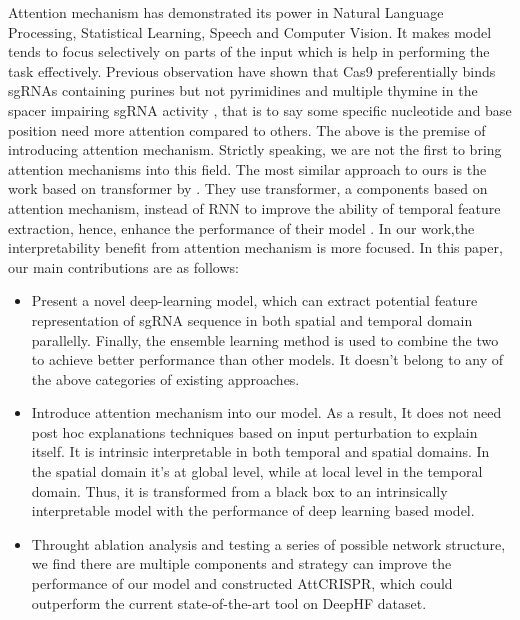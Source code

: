 \documentclass{bioinfo}
\begin{document}
Attention mechanism has demonstrated its power in Natural Language Processing, Statistical Learning, Speech and Computer Vision. 
 It makes model tends to focus selectively on parts of the input which is help in performing the task effectively. 
 Previous observation have shown that Cas9 preferentially binds sgRNAs containing purines but not pyrimidines \citep{wang2014genetic} and multiple thymine in the spacer impairing sgRNA activity \citep{wu2014genome-wide}, 
 that is to say some specific nucleotide and base position need more attention compared to others. 
 The above is the premise of introducing attention mechanism. Strictly speaking, we are not the first to bring attention mechanisms into this field. 
 The most similar approach to ours is the work based on transformer by \citeauthor{Liu2019}. 
 They use transformer, a components based on attention mechanism, instead of RNN to improve the ability of temporal feature extraction, 
 hence, enhance the performance of their model \citep{Liu2019,vaswani2017attention}. 
 In our work,the interpretability benefit from attention mechanism is more focused.
 In this paper, our main contributions are as follows:\vspace*{1pt}
\begin{itemize}
    \item Present a novel deep-learning model, which can extract potential feature representation of sgRNA sequence in both spatial and temporal domain parallelly. 
    Finally, the ensemble learning method is used to combine the two to achieve better performance than other models.
    It doesn't belong to any of the above categories of existing approaches.
    \item Introduce attention mechanism into our model. 
    As a result, It does not need post hoc explanations techniques based on input perturbation to explain itself. 
    It is intrinsic interpretable in both temporal and spatial domains.
    In the spatial domain it's at global level, while at local level in the temporal domain. 
    Thus, it is transformed from a black box to an intrinsically interpretable model with the performance of deep learning based model. 
    \item Throught ablation analysis and testing a series of possible network structure, 
    we find there are multiple components and strategy can improve the performance of our model and constructed AttCRISPR, 
    which could outperform the current state-of-the-art tool on DeepHF dataset.\vspace*{1pt}
\end{itemize}
\end{document}
